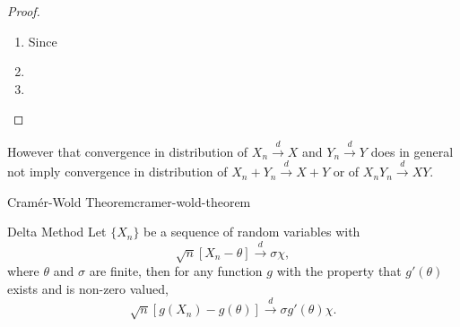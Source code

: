\begin{proof}
    \begin{enumerate}
        \item
              Since
        \item

        \item

    \end{enumerate}
\end{proof}

\begin{note}
    However that convergence in distribution of $X_{n}\stackrel{d}{\rightarrow}X$ and $Y_{n}\stackrel{d}{\rightarrow}Y$ does in general not imply convergence in distribution of $X_n+Y_n\stackrel{d}{\rightarrow}X+Y$ or of $X_nY_n\stackrel{d}{\rightarrow}XY$.
\end{note}

\begin{theorem}{Cram\'er-Wold Theorem}{cramer-wold-theorem}

\end{theorem}

\begin{theorem}{Delta Method}{}
    Let $\{X_{n}\}$ be a sequence of random variables with
    \begin{equation*}
        \sqrt{n}\left[X_{n}-\theta\right] \stackrel{d}{\rightarrow}\sigma\chi,
    \end{equation*}
    where $\theta$ and $\sigma$ are finite, then for any function $g$ with the property that $g'(\theta)$ exists and is non-zero valued,
    \begin{equation*}
        \sqrt{n}\left[g\left(X_{n}\right)-g(\theta)\right] \stackrel{d}{\rightarrow} \sigma g'(\theta)\chi.
    \end{equation*}
\end{theorem}

